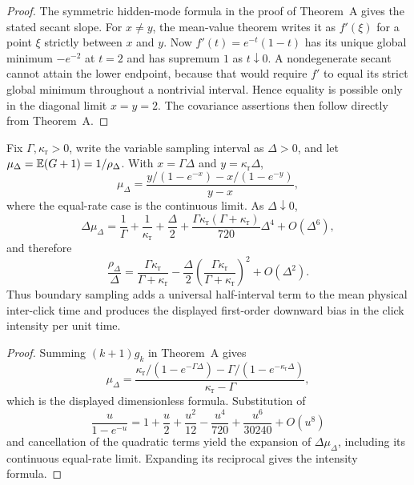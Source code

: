 \begin{proof}
The symmetric hidden-mode formula in the proof of Theorem~A gives the stated
secant slope.  For \(x\ne y\), the mean-value theorem writes it as
\(f'(\xi)\) for a point \(\xi\) strictly between \(x\) and \(y\).  Now
\(f'(t)=e^{-t}(1-t)\) has its unique global minimum \(-e^{-2}\) at \(t=2\)
and has supremum \(1\) as \(t\downarrow0\).  A nondegenerate secant cannot
attain the lower endpoint, because that would require \(f'\) to equal its
strict global minimum throughout a nontrivial interval.  Hence equality is
possible only in the diagonal limit \(x=y=2\).  The covariance assertions
then follow directly from Theorem~A.
\end{proof}

\begin{proposition}
\label{prop:small-sampling-interval-bias-main}
Fix \(\Gamma,\kappa_{\mathrm r}>0\), write the variable sampling interval as
\(\Delta>0\), and let \(\mu_\Delta=\mathbb{E}(G+1)=1/\rho_\Delta\).  With
\(x=\Gamma\Delta\) and \(y=\kappa_{\mathrm r}\Delta\),
\[
\mu_\Delta=\frac{y/(1-e^{-x})-x/(1-e^{-y})}{y-x},
\]
where the equal-rate case is the continuous limit.  As \(\Delta\downarrow0\),
\[
\Delta\mu_\Delta=\frac1\Gamma+\frac1{\kappa_{\mathrm r}}
+\frac{\Delta}{2}
+\frac{\Gamma\kappa_{\mathrm r}(\Gamma+\kappa_{\mathrm r})}{720}\Delta^4
+O(\Delta^6),
\]
and therefore
\[
\frac{\rho_\Delta}{\Delta}
=\frac{\Gamma\kappa_{\mathrm r}}{\Gamma+\kappa_{\mathrm r}}
-\frac{\Delta}{2}
\left(\frac{\Gamma\kappa_{\mathrm r}}{\Gamma+\kappa_{\mathrm r}}\right)^2
+O(\Delta^2).
\]
Thus boundary sampling adds a universal half-interval term to the mean
physical inter-click time and produces the displayed first-order downward
bias in the click intensity per unit time.
\end{proposition}

\begin{proof}
Summing \((k+1)g_k\) in Theorem~A gives
\[
\mu_\Delta=\frac{\kappa_{\mathrm r}/(1-e^{-\Gamma\Delta})
-\Gamma/(1-e^{-\kappa_{\mathrm r}\Delta})}
{\kappa_{\mathrm r}-\Gamma},
\]
which is the displayed dimensionless formula.  Substitution of
\[
\frac{u}{1-e^{-u}}=1+\frac u2+\frac{u^2}{12}
-\frac{u^4}{720}+\frac{u^6}{30240}+O(u^8)
\]
and cancellation of the quadratic terms yield the expansion of
\(\Delta\mu_\Delta\), including its continuous equal-rate limit.  Expanding
its reciprocal gives the intensity formula.
\end{proof}

